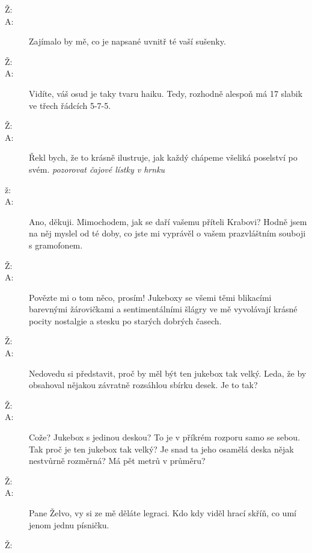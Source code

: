 \documentclass[12pt]{article}
\begin{document}
\begin{description}
\item[Ž:]

\item[A:] Zajímalo by mě, co je napsané uvnitř té vaší sušenky.

\item[Ž:]

\item[A:] Vidíte, váš osud je taky tvaru haiku. Tedy, rozhodně alespoň má
    17 slabik ve třech řádcích 5-7-5.

\item[Ž:]

\item[A:] Řekl bych, že to krásně ilustruje, jak každý chápeme všeliká poselství
    po svém. \textit{pozorovat čajové lístky v hrnku}

\item[ž:]

\item[A:] Ano, děkuji. Mimochodem, jak se daří vašemu příteli Krabovi? Hodně jsem na něj
    myslel od té doby, co jste mi vyprávěl o vašem prazvláštním souboji s gramofonem.

\item[Ž:]

\item[A:] Povězte mi o tom něco, prosím! Jukeboxy se všemi těmi blikacími barevnými
    žárovičkami a sentimentálními šlágry ve mě vyvolávají krásné pocity nostalgie
    a stesku po starých dobrých časech.

\item[Ž:]

\item[A:] Nedovedu si představit, proč by měl být ten jukebox tak velký.
    Leda, že by obsahoval nějakou závratně rozsáhlou sbírku desek. Je to tak?

\item[Ž:]

\item[A:] Cože? Jukebox s jedinou deskou? To je v příkrém rozporu samo se sebou.
    Tak proč je ten jukebox tak velký? Je snad ta jeho osamělá deska nějak
    nestvůrně rozměrná? Má pět metrů v průměru?

\item[Ž:]

\item[A:] Pane Želvo, vy si ze mě děláte legraci. Kdo kdy viděl hrací
    skříň, co umí jenom jednu písničku.

\item[Ž:]


\end{description}
\end{document}
